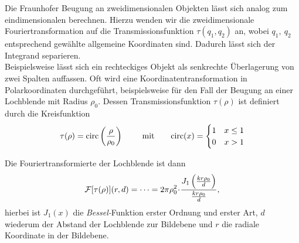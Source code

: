 Die Fraunhofer Beugung an zweidimensionalen Objekten lässt sich analog zum eindimensionalen berechnen. Hierzu wenden wir die zweidimensionale Fouriertransformation auf die Transmissionsfunktion $\tau(q_1,q_2)$ an, wobei $q_1,~q_2$ entsprechend gewählte allgemeine Koordinaten sind. Dadurch lässt sich der Integrand separieren.\\
Beispielsweise lässt sich ein rechteckiges Objekt als senkrechte Überlagerung von zwei Spalten auffassen. Oft wird eine Koordinatentransformation in Polarkoordinaten durchgeführt, beispielsweise für den Fall der Beugung an einer Lochblende mit Radius $\rho_0$. Dessen Transmissionsfunktion $\tau(\rho)$ ist definiert durch die Kreisfunktion
\begin{equation}
\tau(\rho) = \mathrm{circ}\left(\frac{\rho}{\rho_0}\right)
\with \mathrm{circ}(x) =
\begin{cases}
	1 & x \le 1\\
	0  & x > 1
\end{cases}
\end{equation}

Die Fouriertransformierte der Lochblende ist dann
\begin{align}
\mathcal{F}[\tau(\rho)](r,d)=\dots =2\pi\rho_0^2\!\cdot\!\frac{J_1\left(\frac{kr\rho_0}{d}\right)}{\frac{kr\rho_0}{d}},
\end{align}
hierbei ist $J_1(x)$ die \emph{Bessel-}Funktion erster Ordnung und erster Art, $d$ wiederum der Abstand der Lochblende zur Bildebene und $r$ die radiale Koordinate in der Bildebene.



